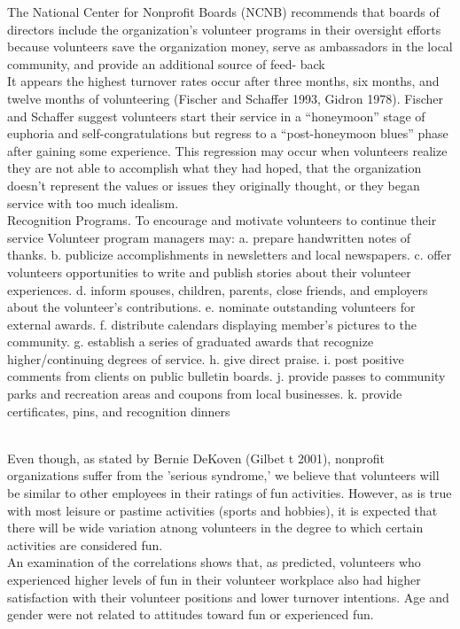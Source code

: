 \documentclass[11pt,fleqn]{book} %
\begin{document}
The National Center for Nonprofit Boards (NCNB) recommends that
boards of directors include the organization’s volunteer programs in their
oversight efforts because volunteers save the organization money, serve as
ambassadors in the local community, and provide an additional source of feed-
back\\

It appears the highest turnover rates occur after three
months, six months, and twelve months of volunteering (Fischer and Schaffer
1993, Gidron 1978). Fischer and Schaffer suggest volunteers start their service
in a “honeymoon” stage of euphoria and self-congratulations but regress to a
“post-honeymoon blues” phase after gaining some experience. This regression
may occur when volunteers realize they are not able to accomplish what they
had hoped, that the organization doesn’t represent the values or issues they
originally thought, or they began service with too much idealism.\\

Recognition Programs. To encourage and motivate volunteers to continue
their service Volunteer program managers may:
a. prepare handwritten notes of thanks.
b. publicize accomplishments in newsletters and local newspapers.
c. offer volunteers opportunities to write and publish stories about their
volunteer experiences.
d. inform spouses, children, parents, close friends, and employers about
the volunteer’s contributions.
e. nominate outstanding volunteers for external awards.
f. distribute calendars displaying member’s pictures to the community.
g. establish a series of graduated awards that recognize higher/continuing
degrees of service.
h. give direct praise.
i. post positive comments from clients on public bulletin boards.
j. provide passes to community parks and recreation areas and coupons
from local businesses.
k. provide certificates, pins, and recognition dinners

\autocite{karl_give_2008}\\
Even though, as stated by Bernie DeKoven (Gilbet t 2001), nonprofit
organizations suffer from the 'serious syndrome,' we believe that
volunteers will be similar to other employees in their ratings of fun
activities. However, as is true with most leisure or pastime activities
(sports and hobbies), it is expected that there will be wide variation
atnong volunteers in the degree to which certain activities are considered
fun.\\

An
examination of the correlations shows that, as predicted, volunteers
who experienced higher levels of fun in their volunteer workplace also
had higher satisfaction with their volunteer positions and lower
turnover intentions. Age and gender were not related to attitudes
toward fun or experienced fun.\\
\end{document}
